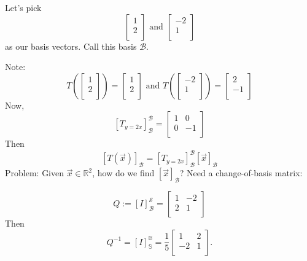 \documentclass[a4paper,10pt]{article}
\begin{document}
\begin{enumerate}
Let's pick 
$$\begin{bmatrix} 
1 \\
2 \\
\end{bmatrix} 
\text{ and }
\begin{bmatrix} 
-2 \\
1 \\
\end{bmatrix} 
$$
as our basis vectors. Call this basis $\mathcal{B}$.

Note:
$$
T\left(
\begin{bmatrix} 
1 \\
2 \\
\end{bmatrix} 
\right)
=
\begin{bmatrix} 
1 \\
2 \\
\end{bmatrix} 
\text{ and }
T\left(
\begin{bmatrix} 
-2 \\
1 \\
\end{bmatrix} 
\right)
=
\begin{bmatrix} 
2 \\
-1 \\
\end{bmatrix} 
$$
Now, 
$$
[T_{y=2x}]_\mathcal{B}^\mathcal{B} = 
\begin{bmatrix}
	1 & 0 \\
	0 & -1 \\
\end{bmatrix}
$$
Then
$$
[T(\vec{x})]_\mathcal{B} = [T_{y=2x}]_\mathcal{B}^\mathcal{B}[\vec{x}]_\mathcal{B}
$$
Problem: Given $\vec{x} \in \mathbb{R}^2$, how do we find $[\vec{x}]_\mathcal{B}$? Need a change-of-basis matrix:

$$
Q:= [I]_\mathcal{B}^\mathcal{S} =
\begin{bmatrix}
	1 & -2 \\
	2 & 1 \\
\end{bmatrix}
$$
Then
$$
Q^{-1} = [I]_\mathbb{S}^\mathbb{B} =
\frac{1}{5}
\begin{bmatrix}
	1 & 2 \\
	-2 & 1 \\
\end{bmatrix}
.
$$


\end{enumerate}
\end{document}
